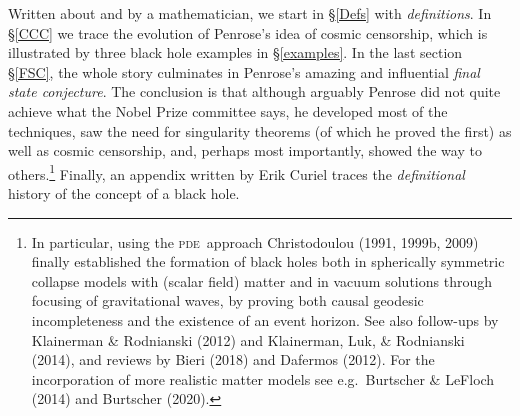 \documentclass[12pt]{article}
\newcommand{\pde}{\textsc{pde}}
\begin{document}
Written about and by a mathematician, we start in \S\ref{Defs} with \emph{definitions}. In \S\ref{CCC}
we trace the evolution of Penrose's idea of cosmic censorship, which is illustrated by three black hole examples in \S\ref{examples}. In the last section \S\ref{FSC}, the whole story culminates in Penrose's amazing and influential \emph{final state conjecture}.
The conclusion is that although arguably Penrose did not quite achieve what the Nobel Prize committee says, he developed most of the  techniques, saw the need for  singularity theorems (of which he proved the first) as well as cosmic censorship, and, perhaps most importantly,  showed the way to others.\footnote{\label{fnAB} 
In particular, using the \pde\ approach   Christodoulou (1991, 1999b,  2009) finally established  the formation of  black holes both in spherically symmetric collapse models with (scalar field) matter and in vacuum solutions through focusing of gravitational waves, by proving both causal geodesic incompleteness and the existence of an event horizon. See also follow-ups by Klainerman \& Rodnianski (2012) and  Klainerman, Luk, \& Rodnianski (2014), and reviews by Bieri (2018) and Dafermos (2012). For the incorporation of more realistic matter models see e.g.\ 
Burtscher \& LeFloch  (2014) and  Burtscher (2020).}
Finally, an appendix written by Erik Curiel traces the \emph{definitional} history of the concept of a black hole.
\end{document}
